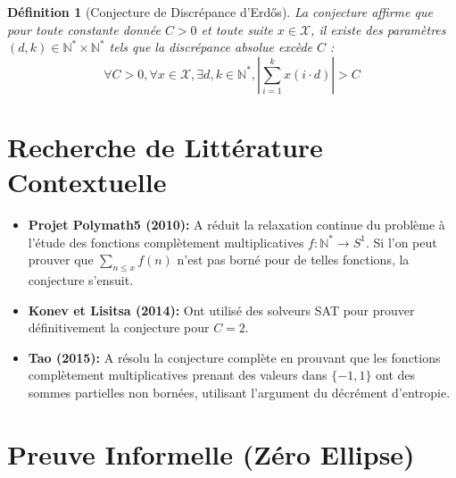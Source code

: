 \documentclass[11pt,a4paper]{article}
\newtheorem{definition}[theorem]{D\'efinition}
\begin{document}
\begin{definition}[Conjecture de Discr\'epance d'Erd\H{o}s]
La conjecture affirme que pour toute constante donn\'ee $C > 0$ et toute suite $x \in \mathcal{X}$, il existe des param\`etres $(d, k) \in \mathbb{N}^* \times \mathbb{N}^*$ tels que la discr\'epance absolue exc\`ede $C$ :
$$ \forall C > 0, \forall x \in \mathcal{X}, \exists d, k \in \mathbb{N}^*, \left| \sum_{i=1}^{k} x(i \cdot d) \right| > C $$
\end{definition}

\section{Recherche de Litt\'erature Contextuelle}

\begin{itemize}
    \item \textbf{Projet Polymath5 (2010):} A r\'eduit la relaxation continue du probl\`eme \`a l'\'etude des fonctions compl\`etement multiplicatives $f : \mathbb{N}^* \to S^1$. Si l'on peut prouver que $\sum_{n \le x} f(n)$ n'est pas born\'e pour de telles fonctions, la conjecture s'ensuit.
    \item \textbf{Konev et Lisitsa (2014):} Ont utilis\'e des solveurs SAT pour prouver d\'efinitivement la conjecture pour $C=2$.
    \item \textbf{Tao (2015):} A r\'esolu la conjecture compl\`ete en prouvant que les fonctions compl\`etement multiplicatives prenant des valeurs dans $\{-1, 1\}$ ont des sommes partielles non born\'ees, utilisant l'argument du d\'ecr\'ement d'entropie.
\end{itemize}

\section{Preuve Informelle (Z\'ero Ellipse)}
\end{document}
